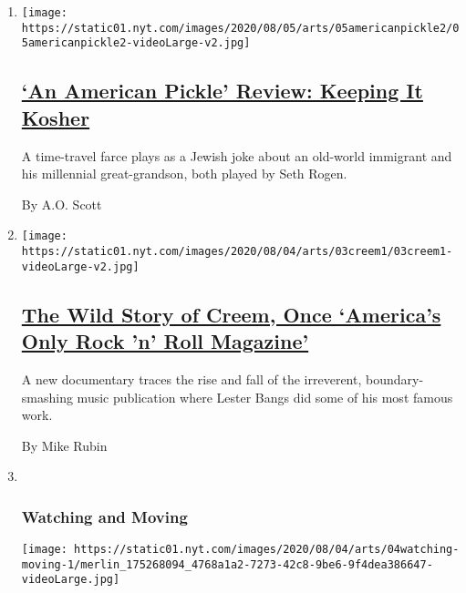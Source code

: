 \begin{enumerate}
\def\labelenumi{\arabic{enumi}.}
\item
  \texttt{[image: https://static01.nyt.com/images/2020/08/05/arts/05americanpickle2/05americanpickle2-videoLarge-v2.jpg]}

  \hypertarget{an-american-pickle-review-keeping-it-kosher}{%
  \subsection{\texorpdfstring{\href{/2020/08/04/movies/an-american-pickle-review.html}{`An
  American Pickle' Review: Keeping It
  Kosher}}{`An American Pickle' Review: Keeping It Kosher}}\label{an-american-pickle-review-keeping-it-kosher}}

  A time-travel farce plays as a Jewish joke about an old-world
  immigrant and his millennial great-grandson, both played by Seth
  Rogen.

  By A.O. Scott
\item
  \texttt{[image: https://static01.nyt.com/images/2020/08/04/arts/03creem1/03creem1-videoLarge-v2.jpg]}

  \hypertarget{the-wild-story-of-creem-once-americas-only-rock-n-roll-magazine}{%
  \subsection{\texorpdfstring{\href{/2020/08/03/arts/music/creem-magazine-documentary.html}{The
  Wild Story of Creem, Once `America's Only Rock 'n' Roll
  Magazine'}}{The Wild Story of Creem, Once `America's Only Rock 'n' Roll Magazine'}}\label{the-wild-story-of-creem-once-americas-only-rock-n-roll-magazine}}

  A new documentary traces the rise and fall of the irreverent,
  boundary-smashing music publication where Lester Bangs did some of his
  most famous work.

  By Mike Rubin
\item ~
  \hypertarget{watching-and-moving}{%
  \subsubsection{Watching and Moving}\label{watching-and-moving}}

  \texttt{[image: https://static01.nyt.com/images/2020/08/04/arts/04watching-moving-1/merlin\_175268094\_4768a1a2-7273-42c8-9be6-9f4dea386647-videoLarge.jpg]}

  \hypertarget{the-vail-all-stars-san-francisco-dreaming-and-black-lives-matter}{%
}
\end{enumerate}
